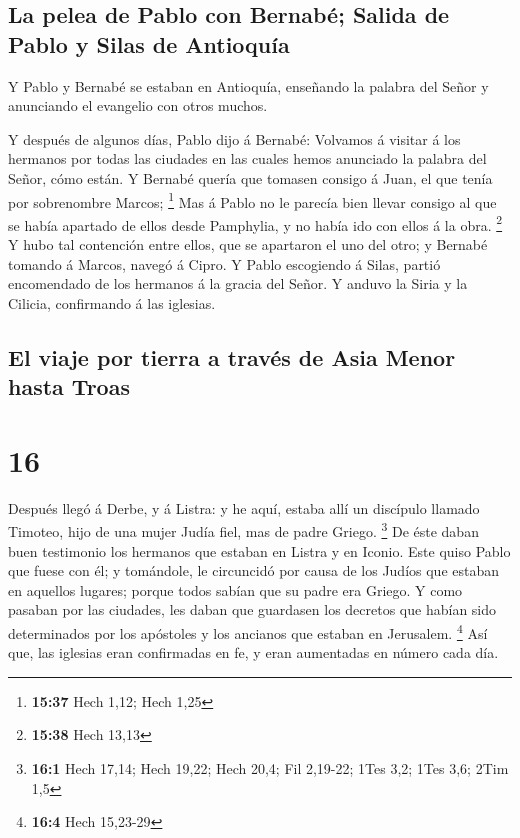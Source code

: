\hypertarget{la-pelea-de-pablo-con-bernabuxe9-salida-de-pablo-y-silas-de-antioquuxeda}{%
\subsection{La pelea de Pablo con Bernabé; Salida de Pablo y Silas de
Antioquía}\label{la-pelea-de-pablo-con-bernabuxe9-salida-de-pablo-y-silas-de-antioquuxeda}}

 Y Pablo y Bernabé se estaban en Antioquía, enseñando la
palabra del Señor y anunciando el evangelio con otros muchos.

 Y después de algunos días, Pablo dijo á Bernabé:
Volvamos á visitar á los hermanos por todas las ciudades en las cuales
hemos anunciado la palabra del Señor, cómo están.  Y
Bernabé quería que tomasen consigo á Juan, el que tenía por sobrenombre
Marcos; \footnote{\textbf{15:37} Hech 1,12; Hech 1,25} 
Mas á Pablo no le parecía bien llevar consigo al que se había apartado
de ellos desde Pamphylia, y no había ido con ellos á la obra.
\footnote{\textbf{15:38} Hech 13,13}  Y hubo tal
contención entre ellos, que se apartaron el uno del otro; y Bernabé
tomando á Marcos, navegó á Cipro.  Y Pablo escogiendo á
Silas, partió encomendado de los hermanos á la gracia del Señor.
 Y anduvo la Siria y la Cilicia, confirmando á las
iglesias.

\hypertarget{el-viaje-por-tierra-a-travuxe9s-de-asia-menor-hasta-troas}{%
\subsection{El viaje por tierra a través de Asia Menor hasta
Troas}\label{el-viaje-por-tierra-a-travuxe9s-de-asia-menor-hasta-troas}}

\hypertarget{section-15}{%
\section{16}\label{section-15}}

 Después llegó á Derbe, y á Listra: y he aquí, estaba allí
un discípulo llamado Timoteo, hijo de una mujer Judía fiel, mas de padre
Griego. \footnote{\textbf{16:1} Hech 17,14; Hech 19,22; Hech 20,4; Fil
  2,19-22; 1Tes 3,2; 1Tes 3,6; 2Tim 1,5}  De éste daban
buen testimonio los hermanos que estaban en Listra y en Iconio.
 Este quiso Pablo que fuese con él; y tomándole, le
circuncidó por causa de los Judíos que estaban en aquellos lugares;
porque todos sabían que su padre era Griego.  Y como
pasaban por las ciudades, les daban que guardasen los decretos que
habían sido determinados por los apóstoles y los ancianos que estaban en
Jerusalem. \footnote{\textbf{16:4} Hech 15,23-29}  Así
que, las iglesias eran confirmadas en fe, y eran aumentadas en número
cada día.

